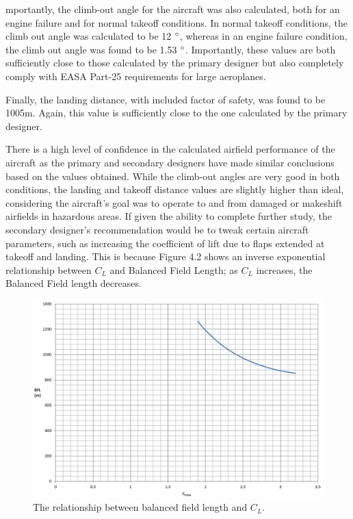 \documentclass[stu, a4paper, 12pt, floatsintext]{apa7}
\numberwithin{figure}{section}
\numberwithin{table}{section}
\numberwithin{equation}{section}
\begin{document}
mportantly, the climb-out angle for the aircraft was also calculated, both for an engine failure and for normal takeoff conditions. In normal takeoff conditions, the climb out angle was calculated to be 12 $\degree$, whereas in an engine failure condition, the climb out angle was found to be 1.53 $\degree$. Importantly, these values are both sufficiently close to those calculated by the primary designer but also completely comply with EASA Part-25 requirements for large aeroplanes.

Finally, the landing distance, with included factor of safety, was found to be 1005m. Again, this value is sufficiently close to the one calculated by the primary designer.

There is a high level of confidence in the calculated airfield performance of the aircraft as the primary and secondary designers have made similar conclusions based on the values obtained. While the climb-out angles are very good in both conditions, the landing and takeoff distance values are slightly higher than ideal, considering the aircraft’s goal was to operate to and from damaged or makeshift airfields in hazardous areas. If given the ability to complete further study, the secondary designer’s recommendation would be to tweak certain aircraft parameters, such as increasing the coefficient of lift due to flaps extended at takeoff and landing. This is because Figure 4.2 shows an inverse exponential relationship between $C_L$ and Balanced Field Length; as $C_L$ increases, the Balanced Field length decreases.
\begin{figure}[H]
    \caption{The relationship between balanced field length and $C_L$.}
    \label{fig:BFL}
    \centering
    \includegraphics[width=1.1\textwidth]{pictures/BFL_CL.jpg}
\end{figure}
\end{document}
